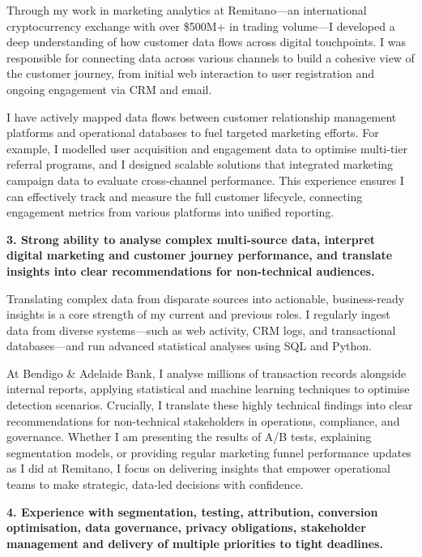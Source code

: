 \documentclass[11pt, a4paper]{article}
\begin{document}
Through my work in marketing analytics at Remitano---an international cryptocurrency exchange with over \$500M+ in trading volume---I developed a deep understanding of how customer data flows across digital touchpoints. I was responsible for connecting data across various channels to build a cohesive view of the customer journey, from initial web interaction to user registration and ongoing engagement via CRM and email.

I have actively mapped data flows between customer relationship management platforms and operational databases to fuel targeted marketing efforts. For example, I modelled user acquisition and engagement data to optimise multi-tier referral programs, and I designed scalable solutions that integrated marketing campaign data to evaluate cross-channel performance. This experience ensures I can effectively track and measure the full customer lifecycle, connecting engagement metrics from various platforms into unified reporting.

\textbf{3. Strong ability to analyse complex multi-source data, interpret digital marketing and customer journey performance, and translate insights into clear recommendations for non-technical audiences.}

Translating complex data from disparate sources into actionable, business-ready insights is a core strength of my current and previous roles. I regularly ingest data from diverse systems---such as web activity, CRM logs, and transactional databases---and run advanced statistical analyses using SQL and Python.

At Bendigo \& Adelaide Bank, I analyse millions of transaction records alongside internal reports, applying statistical and machine learning techniques to optimise detection scenarios. Crucially, I translate these highly technical findings into clear recommendations for non-technical stakeholders in operations, compliance, and governance. Whether I am presenting the results of A/B tests, explaining segmentation models, or providing regular marketing funnel performance updates as I did at Remitano, I focus on delivering insights that empower operational teams to make strategic, data-led decisions with confidence.

\textbf{4. Experience with segmentation, testing, attribution, conversion optimisation, data governance, privacy obligations, stakeholder management and delivery of multiple priorities to tight deadlines.}
\end{document}
